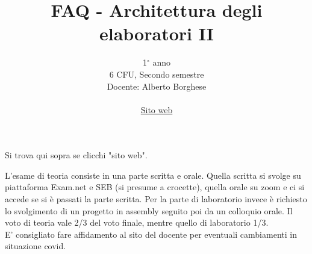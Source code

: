 \documentclass{article}
\title{FAQ - \textbf{Architettura degli elaboratori II}}
\author{
	1$^{\circ}$ anno\\6 CFU, Secondo semestre\\
	Docente: Alberto Borghese\\ 
	\date{}
	\href{https://aborgheseae2.ariel.ctu.unimi.it/v5/home/Default.aspx}{Sito web}
}
\begin{document}
 

\maketitle
	
\begin{QuestionList}
		
     {
        Si trova qui sopra se clicchi "sito web".
	}

		
	 {
		L’esame di teoria consiste in una parte scritta e orale. Quella scritta si svolge su piattaforma Exam.net e SEB (si presume a crocette), quella orale su zoom e ci si accede se si è passati la parte scritta.
		Per la parte di laboratorio invece è richiesto lo svolgimento di un progetto in assembly seguito poi da un colloquio orale. 
		Il voto di teoria vale 2/3 del voto finale, mentre quello di laboratorio 1/3.\\
		E' consigliato fare affidamento al sito del docente per eventuali cambiamenti in situazione covid.
	}
	
		
		
	\end{QuestionList}
	
\end{document}
